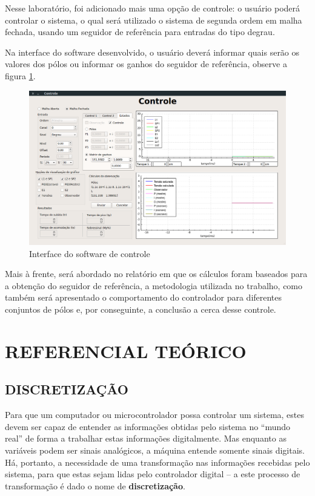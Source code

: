 \documentclass[a4paper,12pt]{article}
\begin{document}
\hspace{4ex}Nesse laboratório, foi adicionado mais uma opção de controle: o usuário poderá controlar o sistema, o qual será utilizado o sistema de segunda ordem em malha fechada, usando um seguidor de referência para entradas do tipo degrau.

\hspace{4ex}Na interface do software desenvolvido, o usuário deverá informar quais serão os valores dos pólos ou informar os ganhos do seguidor de referência, observe a figura \ref{interface}.

\begin{figure}[H]
\centering
\includegraphics[width=13cm]{FotosSeguidor/telaRef.png}
\caption{Interface do software de controle}
\label{interface}
\end{figure}

\hspace{4ex}Mais à frente, será abordado no relatório em que os cálculos foram baseados para a obtenção do seguidor de referência, a metodologia utilizada no trabalho, como também será apresentado o comportamento do controlador para diferentes conjuntos de pólos e, por conseguinte, a conclusão a cerca desse controle.


\newpage


\thispagestyle{main}

\section{REFERENCIAL TEÓRICO}

\subsection{DISCRETIZAÇÃO}
\hspace{4ex}Para que um computador ou microcontrolador possa controlar um sistema, estes devem ser capaz de entender as informações obtidas pelo sistema no “mundo real” de forma a trabalhar estas informações digitalmente. Mas enquanto as variáveis podem ser sinais analógicos, a máquina entende somente sinais digitais. Há, portanto, a necessidade de uma transformação nas informações recebidas pelo sistema, para que estas sejam lidas pelo controlador digital – a este processo de transformação é dado o nome de {\bf discretização}.
\end{document}
